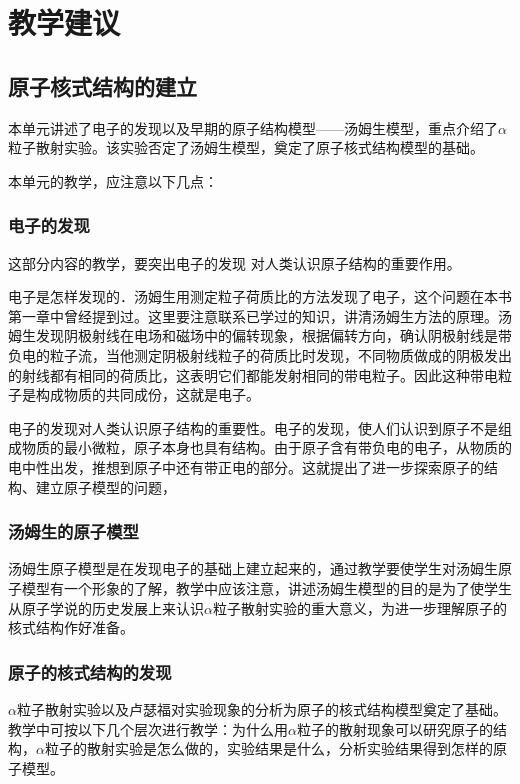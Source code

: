 \section{教学建议}
\subsection{原子核式结构的建立}
本单元讲述了电子的发现以及早期的原子结构模型——汤姆生模型，重点介绍了$\alpha$粒子散射实验。该实验否定了汤姆生模型，奠定了原子核式结构模型的基础。

本单元的教学，应注意以下几点：

\subsubsection{电子的发现}

这部分内容的教学，要突出电子的发现
对人类认识原子结构的重要作用。

电子是怎样发现的．汤姆生用测定粒子荷质比的方法发现了电子，这个问题在本书第一章中曾经提到过。这里要注意联系已学过的知识，讲清汤姆生方法的原理。汤姆生发现阴极射线在电场和磁场中的偏转现象，根据偏转方向，确认阴极射线是带负电的粒子流，当他测定阴极射线粒子的荷质比时发现，不同物质做成的阴极发出的射线都有相同的荷质比，这表明它们都能发射相同的带电粒子。因此这种带电粒子是构成物质的共同成份，这就是电子。

电子的发现对人类认识原子结构的重要性。电子的发现，使人们认识到原子不是组成物质的最小微粒，原子本身也具有结构。由于原子含有带负电的电子，从物质的电中性出发，推想到原子中还有带正电的部分。这就提出了进一步探索原子的结构、建立原子模型的问题，

\subsubsection{汤姆生的原子模型}

汤姆生原子模型是在发现电子的基础上建立起来的，通过教学要使学生对汤姆生原子模型有一个形象的了解，教学中应该注意，讲述汤姆生模型的目的是为了使学生从原子学说的历史发展上来认识$\alpha$粒子散射实验的重大意义，为进一步理解原子的核式结构作好准备。

\subsubsection{原子的核式结构的发现}

$\alpha$粒子散射实验以及卢瑟福对实验现象的分析为原子的核式结构模型奠定了基础。教学中可按以下几个层次进行教学：为什么用$\alpha$粒子的散射现象可以研究原子的结构，$\alpha$粒子的散射实验是怎么做的，实验结果是什么，分析实验结果得到怎样的原子模型。


